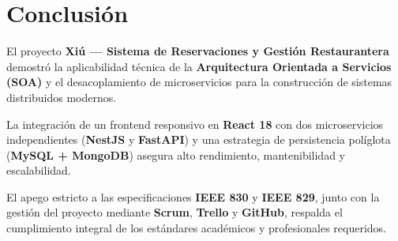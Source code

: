 \documentclass[12pt,a4paper]{article}
\begin{document}
\section{Conclusión}

El proyecto \textbf{Xiú --- Sistema de Reservaciones y Gestión Restaurantera} demostró la aplicabilidad técnica de la \textbf{Arquitectura Orientada a Servicios (SOA)} y el desacoplamiento de microservicios para la construcción de sistemas distribuidos modernos.

La integración de un frontend responsivo en \textbf{React 18} con dos microservicios independientes (\textbf{NestJS} y \textbf{FastAPI}) y una estrategia de persistencia políglota (\textbf{MySQL + MongoDB}) asegura alto rendimiento, mantenibilidad y escalabilidad.

El apego estricto a las especificaciones \textbf{IEEE 830} y \textbf{IEEE 829}, junto con la gestión del proyecto mediante \textbf{Scrum}, \textbf{Trello} y \textbf{GitHub}, respalda el cumplimiento integral de los estándares académicos y profesionales requeridos.
\end{document}
